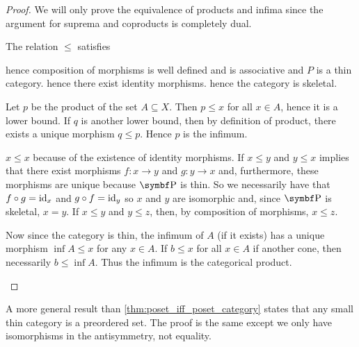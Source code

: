 \begin{proof}
  We will only prove the equivalence of products and infima since the argument for suprema and coproducts is completely dual.

  \begin{description}
    \Implies The relation \( \leq \) satisfies
    \begin{description}
       hence composition of morphisms is well defined and is associative and \( P \) is a thin category.
       hence there exist identity morphisms.
       hence the category is skeletal.
    \end{description}

    Let \( p \) be the product of the set \( A \subseteq X \). Then \( p \leq x \) for all \( x \in A \), hence it is a lower bound. If \( q \) is another lower bound, then by definition of product, there exists a unique morphism \( q \leq p \). Hence \( p \) is the infimum.

    \ImpliedBy\mbox{}
    \begin{description}
       \( x \leq x \) because of the existence of identity morphisms.
       If \( x \leq y \) and \( y \leq x \) implies that there exist morphisms \( f: x \to y \) and \( g: y \to x \) and, furthermore, these morphisms are unique because \( \Cat{P} \) is thin. So we necessarily have that \( f \circ g = \operatorname{id}_x \) and \( g \circ f = \operatorname{id}_y \) so \( x \) and \( y \) are isomorphic and, since \( \Bold{P} \) is skeletal, \( x = y \).
       If \( x \leq y \) and \( y \leq z \), then, by composition of morphisms, \( x \leq z \).
    \end{description}

    Now since the category is thin, the infimum of \( A \) (if it exists) has a unique morphism \( \inf A \leq x \) for any \( x \in A \). If \( b \leq x \) for all \( x \in A \) if another cone, then necessarily \( b \leq \inf A \). Thus the infimum is the categorical product.
  \end{description}
\end{proof}

\begin{remark}\label{remark:small_thin_category_isomorphic_to_preorder}
  A more general result than \cref{thm:poset_iff_poset_category} states that any small thin category is a preordered set. The proof is the same except we only have isomorphisms in the antisymmetry, not equality.
\end{remark}

